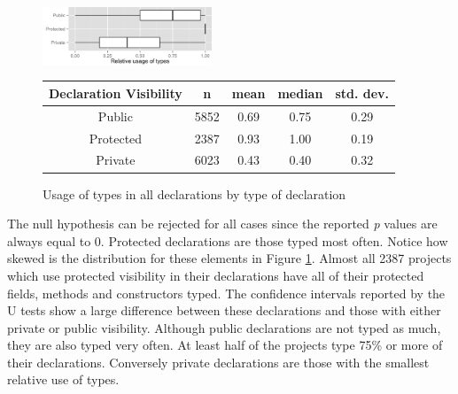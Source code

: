 \documentclass[preprint]{sigplanconf}
\renewcommand{\arraystretch}{1.2}
\begin{document}
\begin{figure}[h]
\centering 
\includegraphics[width=0.45\textwidth]{../analysis/result/all/boxplots/23_declarations_by_visibility.png} 


\vspace{0.3cm}

\renewcommand{\arraystretch}{1.2}
\small
\begin{tabular}{|c|c|c|c|c|}
\hline
Declaration Visibility	& n		& mean	& median	& std. dev.	\\
\hline
\hline
Public    				& 5852	& 0.69	& 0.75		& 0.29		\\ \hline
Protected 				& 2387	& 0.93	& 1.00		& 0.19		\\ \hline
Private   				& 6023	& 0.43	& 0.40		& 0.32		\\ \hline
\end{tabular}
\caption{Usage of types in all declarations by type of declaration}
\label{fig:all_boxplot_visibility_all} 
\end{figure}

The null hypothesis can be rejected for all cases since the reported \emph{p} values are always equal to $0$.
Protected declarations are those typed most often.
Notice how skewed is the distribution for these elements in Figure \ref{fig:all_boxplot_visibility_all}.
Almost all 2387 projects which use protected visibility in their declarations have all of their protected fields, methods and constructors typed.
The confidence intervals reported by the U tests show a large difference between these declarations and those with either private or public visibility.
Although public declarations are not typed as much, they are also typed very often.
At least half of the projects type 75\% or more of their declarations.
Conversely private declarations are those with the smallest relative use of types.
\end{document}
